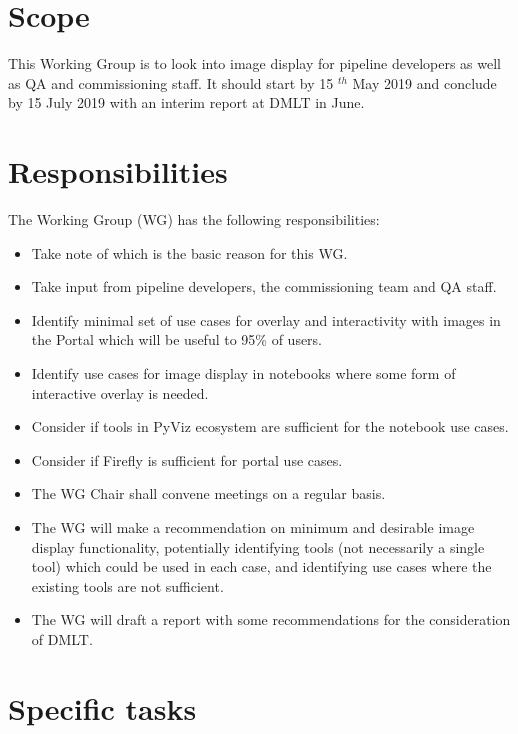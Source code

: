 \section{Scope}

This Working Group is to look into image display for pipeline developers as well as \gls{QA} and commissioning staff.
It should start by 15 $^{th}$ May  2019 and conclude by 15 July 2019 with an interim report at \gls{DMLT} in June.


\section{Responsibilities}

The Working Group (\gls{WG}) has the following responsibilities:

\begin{itemize}
 \item Take note of  which is the basic reason for this \gls{WG}.
 \item Take input from pipeline developers, the commissioning team and \gls{QA} staff.
 \item Identify minimal set of use cases for overlay and interactivity with images in the Portal which will be useful to 95\% of users.
 \item Identify use cases for image display in notebooks where some form of interactive overlay is needed.
 \item Consider if tools in PyViz ecosystem are sufficient for the notebook use cases.
 \item Consider if Firefly is sufficient for portal use cases.
 \item The \gls{WG} Chair shall convene meetings on a regular basis.
 \item The \gls{WG} will make a recommendation on minimum and desirable image display functionality, potentially identifying tools (not necessarily a single tool) which could be used in each case, and identifying use cases where the existing tools are not sufficient.
 \item The \gls{WG} will draft a report with some recommendations for the consideration of \gls{DMLT}.
\end{itemize}


\section{Specific tasks}

